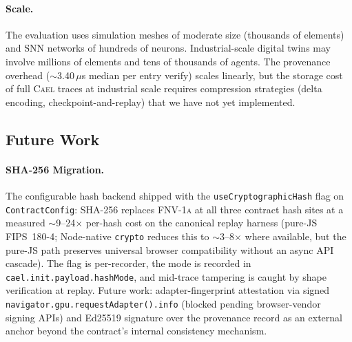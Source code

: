 \documentclass[sigchi-a]{acmart}
\newcommand{\cael}{\textsc{Cael}}
\newcommand{\fnvhash}{\textsc{FNV-1a}}
\begin{document}
\paragraph{Scale.}
The evaluation uses simulation meshes of moderate size (thousands of
elements) and SNN networks of hundreds of neurons. Industrial-scale digital
twins may involve millions of elements and tens of thousands of agents.
The provenance overhead ($\sim$3.40\,$\mu$s median per entry verify) scales linearly, but the
storage cost of full \cael{} traces at industrial scale requires
compression strategies (delta encoding, checkpoint-and-replay) that we
have not yet implemented.

\subsection{Future Work}

\paragraph{SHA-256 Migration.}
The configurable hash backend shipped with the
\texttt{useCryptographicHash} flag on \texttt{ContractConfig}: SHA-256
replaces \fnvhash{} at all three contract hash sites at a measured
$\sim$9--24$\times$ per-hash cost on the canonical replay harness
(pure-JS FIPS~180-4; Node-native \texttt{crypto} reduces this to
$\sim$3--8$\times$ where available, but the pure-JS path preserves
universal browser compatibility without an async API cascade). The
flag is per-recorder, the mode is recorded in
\texttt{cael.init.payload.hashMode}, and mid-trace tampering is caught
by shape verification at replay. Future work: adapter-fingerprint
attestation via signed \texttt{navigator.gpu.requestAdapter().info}
(blocked pending browser-vendor signing APIs) and Ed25519 signature
over the provenance record as an external anchor beyond the
contract's internal consistency mechanism.
\end{document}
